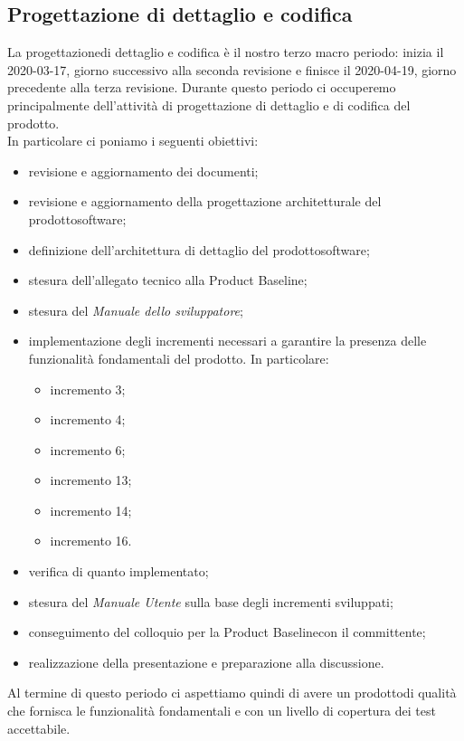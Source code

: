 \subsection{Progettazione di dettaglio e codifica}
La progettazione\glosp di dettaglio e codifica è il nostro terzo macro periodo: inizia il 2020-03-17, giorno successivo alla seconda revisione e finisce il 2020-04-19, giorno precedente alla terza revisione. Durante questo periodo ci occuperemo principalmente dell'attività di progettazione di dettaglio e di codifica del prodotto\glo. \\
In particolare ci poniamo i seguenti obiettivi:
\begin{itemize}
	\item revisione e aggiornamento dei documenti;
	\item revisione e aggiornamento della progettazione architetturale del prodotto\glosp software;
	\item definizione dell'architettura di dettaglio del prodotto\glosp software;
	\item stesura dell'allegato tecnico alla Product Baseline\glo;
	\item stesura del \textit{Manuale dello sviluppatore};
	\item implementazione degli incrementi necessari a garantire la presenza delle funzionalità fondamentali del prodotto. In particolare:
		\begin{itemize}
		\item incremento 3;
		\item incremento 4;
		\item incremento 6;
		\item incremento 13;
		\item incremento 14;
		\item incremento 16.
		\end{itemize}
	\item verifica di quanto implementato;
	\item stesura del \textit{Manuale Utente} sulla base degli incrementi sviluppati;
	\item conseguimento del colloquio per la Product Baseline\glosp con il committente;
	\item realizzazione della presentazione e preparazione alla discussione.
\end{itemize}
Al termine di questo periodo ci aspettiamo quindi di avere un prodotto\glosp di qualità che fornisca le funzionalità fondamentali e con un livello di copertura dei test accettabile. 
